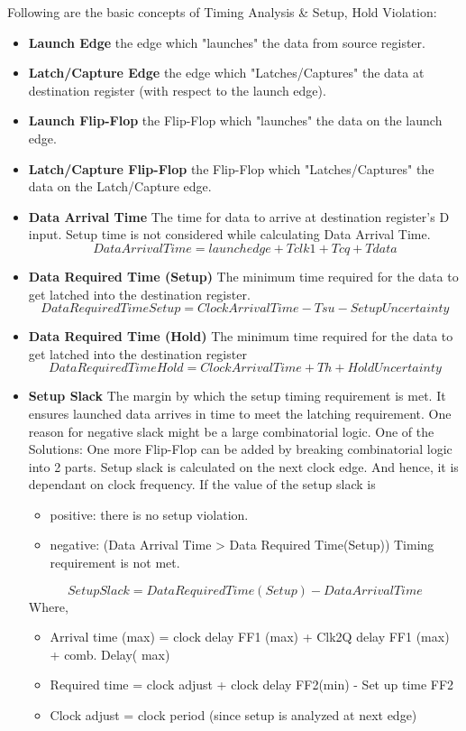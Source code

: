 \fi
\clearpage
Following are the basic concepts of Timing Analysis \& Setup, Hold Violation:
\begin{itemize}
    \item \textbf{Launch Edge} the edge which "launches" the data from source register.
    \item \textbf{Latch/Capture Edge} the edge which "Latches/Captures" the data at destination register (with respect to the launch edge).
    \item \textbf{Launch Flip-Flop} the Flip-Flop which "launches" the data on the launch edge.
    \item \textbf{Latch/Capture Flip-Flop} the Flip-Flop which "Latches/Captures" the data on the Latch/Capture edge.
    \item \textbf{Data Arrival Time} The time for data to arrive at destination register’s D input. Setup time is not considered while calculating Data Arrival Time.
    \[Data Arrival Time = launch edge + Tclk1 + Tcq +Tdata\]
    \item \textbf{Data Required Time (Setup)} The minimum time required for the data to get latched into the destination register. 
    \[Data Required Time Setup = Clock Arrival Time - Tsu - Setup Uncertainty\]
    \item \textbf{Data Required Time (Hold)} The minimum time required for the data to get latched into the destination register
    \[Data Required Time Hold = Clock Arrival Time + Th + Hold Uncertainty \]
    \item \textbf{Setup Slack} The margin by which the setup timing requirement is met. It ensures launched data arrives in time to meet the latching requirement. One reason for negative slack might be a large combinatorial logic. One of the Solutions: One more Flip-Flop can be added by breaking combinatorial logic into 2 parts. Setup slack is calculated on the next clock edge. And hence, it is dependant on clock frequency. If the value of the setup slack is 
    \begin{itemize}
        \item positive:  there is no setup violation.
        \item negative: (Data Arrival Time > Data Required Time(Setup)) Timing requirement is not met.
    \end{itemize}

    \[Setup Slack = Data Required Time(Setup) - Data Arrival Time\]
    Where,
    \begin{itemize}
        \item Arrival time (max) = clock delay FF1 (max) + Clk2Q delay FF1 (max) + comb. Delay( max)
        \item Required time = clock adjust + clock delay FF2(min) - Set up time FF2
        \item Clock adjust = clock period (since setup is analyzed at next edge)
    \end{itemize}


\end{itemize}
